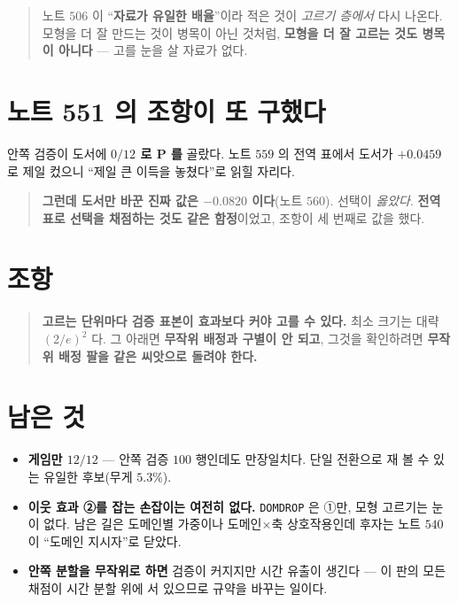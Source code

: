 \documentclass[11pt]{article}
\begin{document}
\begin{quote}
노트 $506$ 이 ``\textbf{자료가 유일한 배율}''이라 적은 것이 \emph{고르기
층에서} 다시 나온다. 모형을 더 잘 만드는 것이 병목이 아닌 것처럼,
\textbf{모형을 더 잘 고르는 것도 병목이 아니다} --- 고를 눈을 살 자료가 없다.
\end{quote}

\section*{노트 551 의 조항이 또 구했다}

안쪽 검증이 도서에 \textbf{$0/12$ 로 P 를} 골랐다. 노트 $559$ 의 전역 표에서
도서가 $+0.0459$ 로 제일 컸으니 ``제일 큰 이득을 놓쳤다''로 읽힐 자리다.

\begin{quote}
\textbf{그런데 도서만 바꾼 진짜 값은 $-0.0820$ 이다}(노트 $560$). 선택이
\emph{옳았다}. \textbf{전역 표로 선택을 채점하는 것도 같은 함정}이었고, 조항이
세 번째로 값을 했다.
\end{quote}

\section*{조항}

\begin{quote}
\textbf{고르는 단위마다 검증 표본이 효과보다 커야 고를 수 있다.} 최소 크기는
대략 $(2/e)^2$ 다. 그 아래면 \textbf{무작위 배정과 구별이 안 되고}, 그것을
확인하려면 \textbf{무작위 배정 팔을 같은 씨앗으로 돌려야 한다.}
\end{quote}

\section*{남은 것}

\begin{itemize}
\item \textbf{게임만 $12/12$} --- 안쪽 검증 $100$ 행인데도 만장일치다. 단일
전환으로 재 볼 수 있는 유일한 후보(무게 $5.3\%$).
\item \textbf{이웃 효과 ②를 잡는 손잡이는 여전히 없다.} \texttt{DOMDROP} 은
①만, 모형 고르기는 눈이 없다. 남은 길은 도메인별 가중이나 도메인$\times$축
상호작용인데 후자는 노트 $540$ 이 ``도메인 지시자''로 닫았다.
\item \textbf{안쪽 분할을 무작위로 하면} 검증이 커지지만 시간 유출이 생긴다 ---
이 판의 모든 채점이 시간 분할 위에 서 있으므로 규약을 바꾸는 일이다.
\end{itemize}
\end{document}
